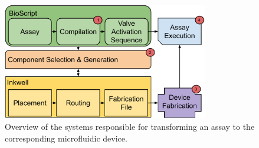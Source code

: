 \begin{figure}[htb]
    \centering
    \includegraphics[width=0.8\textwidth]{figures/system_overview.pdf}
    \caption{Overview of the systems responsible for transforming an assay to the corresponding microfluidic device.}
    \label{fig:workflow}
\end{figure}



